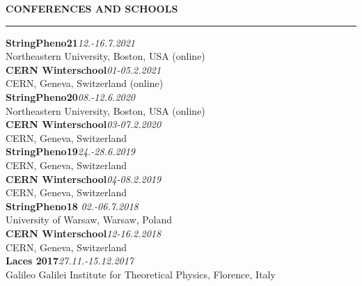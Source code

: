 \documentclass[a4paper,12pt,twoside,openright]{report}
\newenvironment{rSection}[1]{ %
  \sectionskip
  \MakeUppercase{\bf #1} %
  \sectionlineskip
  \hrule %
  \begin{list}{}{ %
    \setlength{\leftmargin}{1.5em} %
  }
  \item[]
}{
  \end{list}
}
\def\sectionlineskip{\medskip} %
\def\sectionskip{\medskip} %
\begin{document}
            \newpage
            \begin{rSection}{Conferences and Schools}
               \vspace{7pt}
            {\bf StringPheno21}\hfill {\em 12.-16.7.2021}
            \\ Northeastern University, Boston, USA (online)\vspace{7pt}
            \\{\bf CERN Winterschool}\hfill {\em 01-05.2.2021}
            \\CERN, Geneva, Switzerland (online)\vspace{7pt}
            \\{\bf StringPheno20}\hfill {\em 08.-12.6.2020}
            \\ Northeastern University, Boston, USA (online)\vspace{7pt}
            \\{\bf CERN Winterschool}\hfill {\em 03-07.2.2020}
            \\CERN, Geneva, Switzerland\vspace{7pt}
            \\{\bf StringPheno19}\hfill {\em 24.-28.6.2019}
            \\ CERN, Geneva, Switzerland\vspace{7pt}
            \\{\bf CERN Winterschool}\hfill {\em 04-08.2.2019}
            \\CERN, Geneva, Switzerland\vspace{7pt}
            \\{\bf StringPheno18} \hfill {\em 02.-06.7.2018}
            \\University of Warsaw, Warsaw, Poland\vspace{7pt}
            \\{\bf CERN Winterschool}\hfill{\em 12-16.2.2018}
            \\CERN, Geneva, Switzerland \vspace{7pt}
            \\{\bf Laces 2017}\hfill{\em 27.11.-15.12.2017}
            \\Galileo Galilei Institute for Theoretical Physics, Florence, Italy
            
            \end{rSection}
            
\end{document}
